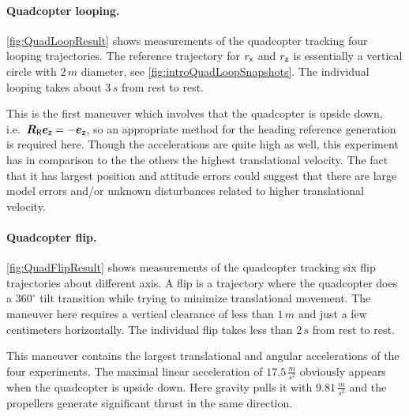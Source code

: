 \paragraph{Quadcopter looping.}
\autoref{fig:QuadLoopResult} shows measurements of the quadcopter tracking four looping trajectories.
The reference trajectory for $r_{\mathsf{x}}$ and $r_{\mathsf{z}}$ is essentially a vertical circle with $2\,\unit{m}$ diameter, see \autoref{fig:introQuadLoopSnapshots}.
The individual looping takes about $3\,\unit{s}$ from rest to rest.

This is the first maneuver which involves that the quadcopter is upside down, i.e.\ $\boldsymbol{R}_{\mathsf{R}} \boldsymbol{e}_{\mathsf{z}} = -\boldsymbol{e}_{\mathsf{z}}$, so an appropriate method for the heading reference generation is required here.
Though the accelerations are quite high as well, this experiment has in comparison to the the others the highest translational velocity.
The fact that it has largest position and attitude errors could suggest that there are large model errors and/or unknown disturbances related to higher translational velocity.


\paragraph{Quadcopter flip.}
\autoref{fig:QuadFlipResult} shows measurements of the quadcopter tracking six flip trajectories about different axis.
A flip is a trajectory where the quadcopter does a $360^\circ$ tilt transition while trying to minimize translational movement.
The maneuver here requires a vertical clearance of less than $1\,\unit{m}$ and just a few centimeters horizontally.
The individual flip takes less than $2\,\unit{s}$ from rest to rest.

This maneuver contains the largest translational and angular accelerations of the four experiments.
The maximal linear acceleration of $17.5\,\tfrac{\unit{m}}{\unit{s}^2}$ obviously appears when the quadcopter is upside down.
Here gravity pulls it with $9.81\,\tfrac{\unit{m}}{\unit{s}^2}$ and the propellers generate significant thrust in the same direction.

